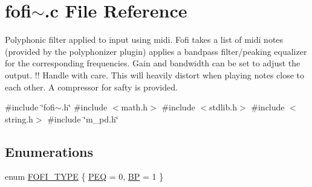 \hypertarget{fofi~_8c}{}\section{fofi$\sim$.c File Reference}
\label{fofi~_8c}


Polyphonic filter applied to input using midi. Fofi takes a list of midi notes (provided by the polyphonizer plugin) applies a bandpass filter/peaking equalizer for the corresponding frequencies. Gain and bandwidth can be set to adjust the output. !! Handle with care. This will heavily distort when playing notes close to each other. A compressor for safty is provided.  


{\ttfamily \#include \char`\"{}fofi$\sim$.\+h\char`\"{}}\newline
{\ttfamily \#include $<$math.\+h$>$}\newline
{\ttfamily \#include $<$stdlib.\+h$>$}\newline
{\ttfamily \#include $<$string.\+h$>$}\newline
{\ttfamily \#include \char`\"{}m\+\_\+pd.\+h\char`\"{}}\newline
\subsection*{Enumerations}
\begin{DoxyCompactItemize}
\item 
enum \mbox{\hyperlink{fofi~_8c_ae6be347e31c48fcae5108f6db7a8bcfd}{F\+O\+F\+I\+\_\+\+T\+Y\+PE}} \{ \mbox{\hyperlink{fofi~_8c_ae6be347e31c48fcae5108f6db7a8bcfda4579b52acef1f8eda7cbb6a2337346b0}{P\+EQ}} = 0, 
\mbox{\hyperlink{fofi~_8c_ae6be347e31c48fcae5108f6db7a8bcfdaf5a5119c2b95cc7f4f3e20f56576ee3e}{BP}} = 1
 \}
\end{DoxyCompactItemize}
